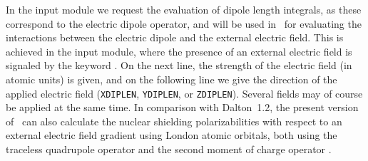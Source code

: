 In the  input module we request the evaluation of dipole
length integrals, as these correspond to
the electric dipole operator, 
and will be used in \sir\ for evaluating the interactions between the
electric dipole and the external electric field. This is achieved in
the  input module, where the presence of an external
electric field is signaled by the
keyword . On the next line, the
strength of the electric field (in atomic units) is given, and on the following
line we give the direction of the applied electric field
(\verb|XDIPLEN|, \verb|YDIPLEN|, or \verb|ZDIPLEN|). Several fields may
of course be applied at the same time. In comparison with Dalton~1.2, the present version of \dalton\ can also calculate the nuclear
shielding polarizabilities with respect to an external electric field
gradient using London atomic orbitals, both using the traceless
quadrupole operator  and the second moment of charge
operator .
